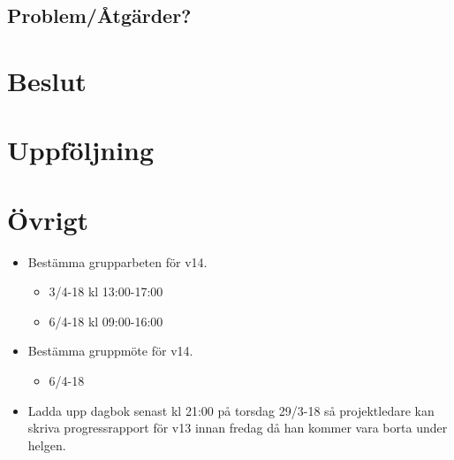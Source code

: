 \subsection*{Problem/Åtgärder?}


\section*{Beslut}

\section*{Uppföljning}

\newpage

\section*{Övrigt}
\begin{itemize}[noitemsep]
    \item Bestämma grupparbeten för v14.
    \begin{itemize}[noitemsep]
        \item 3/4-18 kl 13:00-17:00
        \item 6/4-18 kl 09:00-16:00
    \end{itemize}
    \item Bestämma gruppmöte för v14.
    \begin{itemize}[noitemsep]
        \item 6/4-18
    \end{itemize}
    \item Ladda upp dagbok senast kl 21:00 på torsdag 29/3-18 så projektledare kan skriva progressrapport för v13 innan fredag då han kommer vara borta under helgen.
\end{itemize}